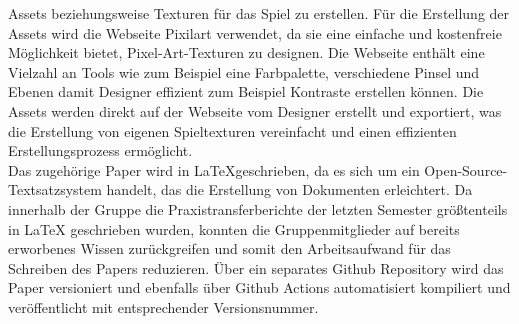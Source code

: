 Assets beziehungsweise Texturen für das Spiel zu erstellen.
Für die Erstellung der Assets wird die Webseite Pixilart verwendet, da sie eine einfache und kostenfreie Möglichkeit
bietet, Pixel-Art-Texturen zu designen.
Die Webseite enthält eine Vielzahl an Tools wie zum Beispiel eine Farbpalette, verschiedene
Pinsel und Ebenen damit Designer effizient zum Beispiel Kontraste erstellen können.
Die Assets werden direkt auf der Webseite vom Designer erstellt und exportiert, was die Erstellung von eigenen
Spieltexturen vereinfacht und einen effizienten Erstellungsprozess ermöglicht.\\
\newline
Das zugehörige Paper wird in \LaTeX{}geschrieben, da es sich um ein Open-Source-Textsatzsystem handelt, das die
Erstellung von Dokumenten erleichtert.
Da innerhalb der Gruppe die Praxistransferberichte der letzten Semester größtenteils in \LaTeX{} geschrieben wurden,
konnten die Gruppenmitglieder auf bereits erworbenes Wissen zurückgreifen und somit den Arbeitsaufwand für das Schreiben
des Papers reduzieren.
Über ein separates Github Repository wird das Paper versioniert und ebenfalls über Github Actions automatisiert 
kompiliert und veröffentlicht mit entsprechender Versionsnummer.
